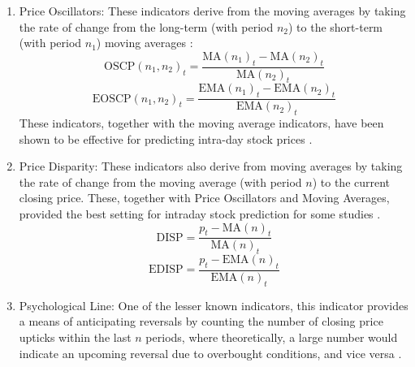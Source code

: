 \documentclass[stu,floatsintext]{apa7}
\begin{document}
\begin{enumerate}
\begin{equation}
\begin{cases}
  \text{Buy when MACD}(n_1,n_2)_t>0\\
  \text{Sell when MACD}(n_1,n_2)_t<0
\end{cases}\end{equation}
\begin{equation}\text{signal line crossover}=\begin{cases}
  \text{Buy when Histogram}(n_1,n_2,n_3)_t>0\\
  \text{Sell when Histogram}(n_1,n_2,n_3)_t<0
\end{cases}\end{equation}
Either trading rule can be used, although the latter is more popular in recent literature \parencite{kang2021macd}.
\item Price Oscillators: These indicators derive from the moving averages by taking the rate of change from the long-term (with period $n_2$) to the short-term (with period $n_1$) moving averages \parencite{son2012forecasting}:
\begin{equation}\text{OSCP}(n_1,n_2)_t=\frac{\text{MA}(n_1)_t-\text{MA}(n_2)_t}{\text{MA}(n_2)_t}\end{equation}
\begin{equation}\text{EOSCP}(n_1,n_2)_t=\frac{\text{EMA}(n_1)_t-\text{EMA}(n_2)_t}{\text{EMA}(n_2)_t}\end{equation}
These indicators, together with the moving average indicators, have been shown to be effective for predicting intra-day stock prices \parencite{tanakayamawaki2007adaptive}.
\item Price Disparity: These indicators also derive from moving averages by taking the rate of change from the moving average (with period $n$) to the current closing price. These, together with Price Oscillators and Moving Averages, provided the best setting for intraday stock prediction for some studies \parencite{son2012forecasting,tanakayamawaki2007adaptive}.
\begin{equation}\text{DISP}=\frac{p_t-\text{MA}(n)_t}{\text{MA}(n)_t}\end{equation}
\begin{equation}\text{EDISP}=\frac{p_t-\text{EMA}(n)_t}{\text{EMA}(n)_t}\end{equation}
\item Psychological Line: One of the lesser known indicators, this indicator provides a means of anticipating reversals by counting the number of closing price upticks within the last $n$ periods, where theoretically, a large number would indicate an upcoming reversal due to overbought conditions, and vice versa \parencite{tanakayamawaki2007adaptive}.

\end{enumerate}
\end{document}
